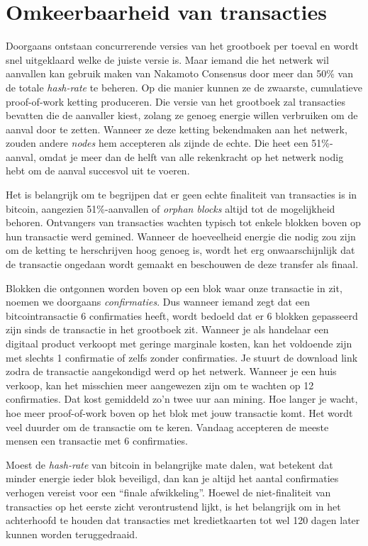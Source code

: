\section{Omkeerbaarheid van transacties}
Doorgaans ontstaan concurrerende versies van het grootboek per toeval en wordt snel uitgeklaard welke de juiste versie is. Maar iemand die het netwerk wil aanvallen kan gebruik maken van Nakamoto Consensus door meer dan 50\% van de totale \textit{hash-rate} te beheren. Op die manier kunnen ze de zwaarste, cumulatieve proof-of-work ketting produceren. Die versie van het grootboek zal transacties bevatten die de aanvaller kiest, zolang ze genoeg energie willen verbruiken om de aanval door te zetten. Wanneer ze deze ketting bekendmaken aan het netwerk, zouden andere \textit{nodes} hem accepteren als zijnde de echte. Die heet een 51\%-aanval, omdat je meer dan de helft van alle rekenkracht op het netwerk nodig hebt om de aanval succesvol uit te voeren.

Het is belangrijk om te begrijpen dat er geen echte finaliteit van transacties is in bitcoin, aangezien 51\%-aanvallen of \textit{orphan blocks} altijd tot de mogelijkheid behoren. Ontvangers van transacties wachten typisch tot enkele blokken boven op hun transactie werd gemined. Wanneer de hoeveelheid energie die nodig zou zijn om de ketting te herschrijven hoog genoeg is, wordt het erg onwaarschijnlijk dat de transactie ongedaan wordt gemaakt en beschouwen de deze transfer als finaal.

Blokken die ontgonnen worden boven op een blok waar onze transactie in zit, noemen we doorgaans \textit{confirmaties}. Dus wanneer iemand zegt dat een bitcointransactie 6 confirmaties heeft, wordt bedoeld dat er 6 blokken gepasseerd zijn sinds de transactie in het grootboek zit. Wanneer je als handelaar een digitaal product verkoopt met geringe marginale kosten, kan het voldoende zijn met slechts 1 confirmatie of zelfs zonder confirmaties. Je stuurt de download link zodra de transactie aangekondigd werd op het netwerk. Wanneer je een huis verkoop, kan het misschien meer aangewezen zijn om te wachten op 12 confirmaties. Dat kost gemiddeld zo’n twee uur aan mining. Hoe langer je wacht, hoe meer proof-of-work boven op het blok met jouw transactie komt. Het wordt veel duurder om de transactie om te keren. Vandaag accepteren de meeste mensen een transactie met 6 confirmaties.

Moest de \textit{hash-rate} van bitcoin in belangrijke mate dalen, wat betekent dat minder energie ieder blok beveiligd, dan kan je altijd het aantal confirmaties verhogen vereist voor een “finale afwikkeling”. Hoewel de niet-finaliteit van transacties op het eerste zicht verontrustend lijkt, is het belangrijk om in het achterhoofd te houden dat transacties met kredietkaarten tot wel 120 dagen later kunnen worden teruggedraaid.

